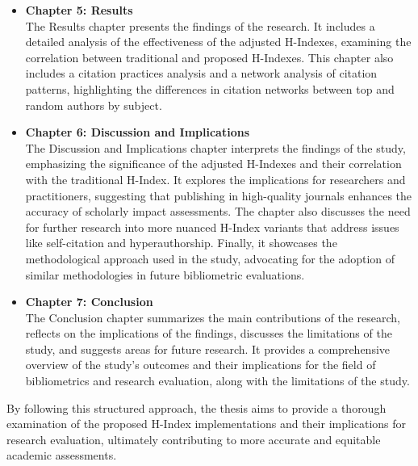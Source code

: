 \begin{itemize}
      \item \textbf{Chapter 5: Results} \\
            The Results chapter presents the findings of the research.
            It includes a detailed analysis of the effectiveness of the adjusted H-Indexes,
            examining the correlation between traditional and proposed H-Indexes.
            This chapter also includes a citation practices analysis and a network
            analysis of citation patterns, highlighting the differences in citation networks between
            top and random authors by subject. %

      \item \textbf{Chapter 6: Discussion and Implications} \\
            The Discussion and Implications chapter interprets the findings of the study,
            emphasizing the significance of the adjusted H-Indexes and their correlation
            with the traditional H-Index. It explores the implications for researchers and practitioners,
            suggesting that publishing in high-quality journals enhances the accuracy of scholarly impact assessments.
            The chapter also discusses the need for further research into more nuanced H-Index variants that address issues
            like self-citation and hyperauthorship. Finally, it showcases the methodological approach used in the study,
            advocating for the adoption of similar methodologies in future bibliometric evaluations.

      \item \textbf{Chapter 7: Conclusion} \\
            The Conclusion chapter summarizes the main contributions of the research,
            reflects on the implications of the findings, discusses the limitations of the study,
            and suggests areas for future research. It provides a comprehensive overview of the study's
            outcomes and their implications for the field of bibliometrics and research evaluation, along
            with the limitations of the study.
\end{itemize}

By following this structured approach, the thesis aims to provide a thorough
examination of the proposed H-Index implementations and their implications for
research evaluation, ultimately contributing to more accurate and equitable
academic assessments.

